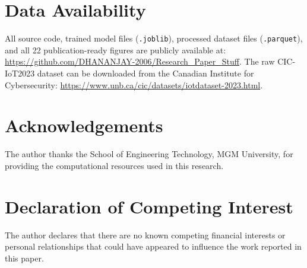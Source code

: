 \documentclass[review,12pt]{elsarticle}
\begin{document}
\section*{Data Availability}
All source code, trained model files (\texttt{.joblib}), processed dataset files (\texttt{.parquet}), and all 22 publication-ready figures are publicly available at: \url{https://github.com/DHANANJAY-2006/Research_Paper_Stuff}. The raw CIC-IoT2023 dataset can be downloaded from the Canadian Institute for Cybersecurity: \url{https://www.unb.ca/cic/datasets/iotdataset-2023.html}.

\section*{Acknowledgements}
The author thanks the School of Engineering Technology, MGM University, for providing the computational resources used in this research.

\section*{Declaration of Competing Interest}
The author declares that there are no known competing financial interests or personal relationships that could have appeared to influence the work reported in this paper.


\end{document}
